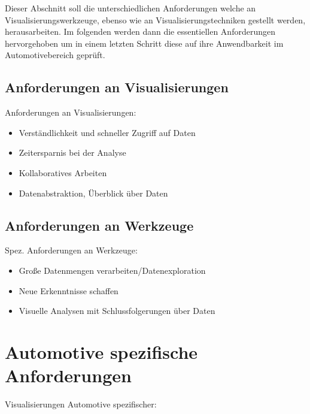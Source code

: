 \documentclass[draft=false
              ,paper=a4
              ,twoside=false
              ,fontsize=11pt
              ,headsepline
              ,BCOR10mm
              ,DIV11
              ]{scrbook}
\newcommand{\TODO}[1]{\colorbox{yellow}{\textcolor{red}{[TODO: #1]}}}
\begin{document}
Dieser Abschnitt soll die unterschiedlichen Anforderungen welche an Visualisierungswerkzeuge, ebenso wie an Visualisierungstechniken gestellt werden, herausarbeiten. Im folgenden werden dann die essentiellen Anforderungen hervorgehoben um in einem letzten Schritt diese auf ihre Anwendbarkeit im Automotivebereich geprüft.


\subsection{Anforderungen an Visualisierungen} %
\label{sub:anforderungen_an_visualisierungen}

Anforderungen an Visualisierungen:

\begin{itemize}
  \item Verständlichkeit und schneller Zugriff auf Daten
  \item Zeitersparnis bei der Analyse
  \item Kollaboratives Arbeiten
  \item Datenabstraktion, Überblick über Daten
\end{itemize}

\subsection{Anforderungen an Werkzeuge} %
\label{sub:anforderungen_an_werkzeuge}

Spez. Anforderungen an Werkzeuge:

\begin{itemize}
  \item Große Datenmengen verarbeiten/Datenexploration 
  \item Neue Erkenntnisse schaffen
  \item Visuelle Analysen mit Schlussfolgerungen über Daten
\end{itemize}

\section{Automotive spezifische Anforderungen} %
\label{sec:automotive_spezifische_anforderungen}
Visualisierungen Automotive spezifischer:
\end{document}
